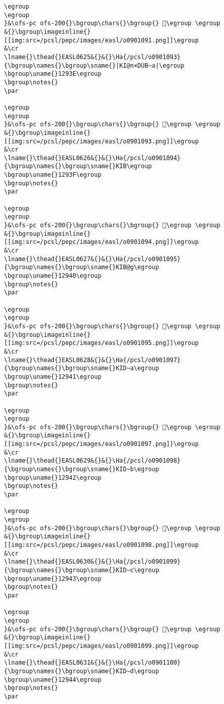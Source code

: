 \begin{verbatim}
\egroup
\egroup
}&\ofs-pc ofs-200{}\bgroup\chars{}\bgroup{} 𒤽\egroup \egroup
&{}\bgroup\imageinline{}[[img:src=/pcsl/pepc/images/easl/o0901091.png]]\egroup
&\cr
\lname{}\thead{}EASL0625&{}&{}\Ha{/pcsl/o0901093}{\bgroup\names{}\bgroup\sname{}|KI@n×DUB∼a|\egroup
\bgroup\uname{}1293E\egroup
\bgroup\notes{}
\par 

\egroup
\egroup
}&\ofs-pc ofs-200{}\bgroup\chars{}\bgroup{} 𒤾\egroup \egroup
&{}\bgroup\imageinline{}[[img:src=/pcsl/pepc/images/easl/o0901093.png]]\egroup
&\cr
\lname{}\thead{}EASL0626&{}&{}\Ha{/pcsl/o0901094}{\bgroup\names{}\bgroup\sname{}KIB\egroup
\bgroup\uname{}1293F\egroup
\bgroup\notes{}
\par 

\egroup
\egroup
}&\ofs-pc ofs-200{}\bgroup\chars{}\bgroup{} 𒤿\egroup \egroup
&{}\bgroup\imageinline{}[[img:src=/pcsl/pepc/images/easl/o0901094.png]]\egroup
&\cr
\lname{}\thead{}EASL0627&{}&{}\Ha{/pcsl/o0901095}{\bgroup\names{}\bgroup\sname{}KIB@g\egroup
\bgroup\uname{}12940\egroup
\bgroup\notes{}
\par 

\egroup
\egroup
}&\ofs-pc ofs-200{}\bgroup\chars{}\bgroup{} 𒥀\egroup \egroup
&{}\bgroup\imageinline{}[[img:src=/pcsl/pepc/images/easl/o0901095.png]]\egroup
&\cr
\lname{}\thead{}EASL0628&{}&{}\Ha{/pcsl/o0901097}{\bgroup\names{}\bgroup\sname{}KID∼a\egroup
\bgroup\uname{}12941\egroup
\bgroup\notes{}
\par 

\egroup
\egroup
}&\ofs-pc ofs-200{}\bgroup\chars{}\bgroup{} 𒥁\egroup \egroup
&{}\bgroup\imageinline{}[[img:src=/pcsl/pepc/images/easl/o0901097.png]]\egroup
&\cr
\lname{}\thead{}EASL0629&{}&{}\Ha{/pcsl/o0901098}{\bgroup\names{}\bgroup\sname{}KID∼b\egroup
\bgroup\uname{}12942\egroup
\bgroup\notes{}
\par 

\egroup
\egroup
}&\ofs-pc ofs-200{}\bgroup\chars{}\bgroup{} 𒥂\egroup \egroup
&{}\bgroup\imageinline{}[[img:src=/pcsl/pepc/images/easl/o0901098.png]]\egroup
&\cr
\lname{}\thead{}EASL0630&{}&{}\Ha{/pcsl/o0901099}{\bgroup\names{}\bgroup\sname{}KID∼c\egroup
\bgroup\uname{}12943\egroup
\bgroup\notes{}
\par 

\egroup
\egroup
}&\ofs-pc ofs-200{}\bgroup\chars{}\bgroup{} 𒥃\egroup \egroup
&{}\bgroup\imageinline{}[[img:src=/pcsl/pepc/images/easl/o0901099.png]]\egroup
&\cr
\lname{}\thead{}EASL0631&{}&{}\Ha{/pcsl/o0901100}{\bgroup\names{}\bgroup\sname{}KID∼d\egroup
\bgroup\uname{}12944\egroup
\bgroup\notes{}
\par 


\end{verbatim}
